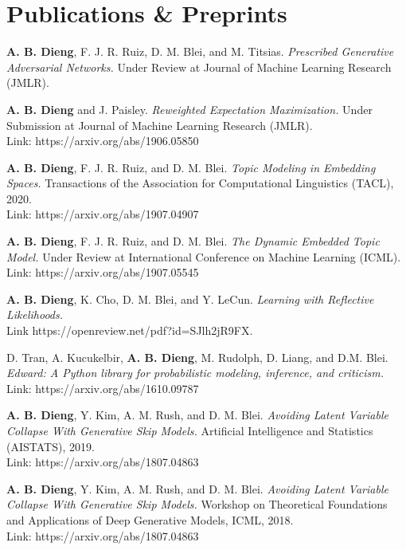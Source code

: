\documentclass[letterpaper,200pt]{article}
\renewenvironment{itemize}{
  \begin{list}{}{
    \setlength{\leftmargin}{1.5em}
  }
}{
  \end{list}
}
\begin{document}
\section*{Publications \& Preprints}
\begin{itemize}
	\item \textbf{A. B. Dieng}, F. J. R. Ruiz, D. M. Blei, and M. Titsias.
		\textit{Prescribed Generative Adversarial Networks.} 
		Under Review at Journal of Machine Learning Research (JMLR).
	\item \textbf{A. B. Dieng} and J. Paisley.
		\textit{Reweighted Expectation Maximization.} 
		Under Submission at Journal of Machine Learning Research (JMLR).\\
		Link: https://arxiv.org/abs/1906.05850
	\item \textbf{A. B. Dieng}, F. J. R. Ruiz, and D. M. Blei.
		\textit{Topic Modeling in Embedding Spaces.} 
		Transactions of the Association for Computational Linguistics (TACL), 2020.\\
		Link: https://arxiv.org/abs/1907.04907
	\item \textbf{A. B. Dieng}, F. J. R. Ruiz, and D. M. Blei.
		\textit{The Dynamic Embedded Topic Model.} 
		Under Review at International Conference on Machine Learning (ICML).\\
		Link: https://arxiv.org/abs/1907.05545
	\item \textbf{A. B. Dieng}, K. Cho, D. M. Blei, and Y. LeCun.
		\textit{Learning with Reflective Likelihoods.} \\
		Link https://openreview.net/pdf?id=SJlh2jR9FX.
	\item D. Tran,  A. Kucukelbir, \textbf{A. B. Dieng}, M. Rudolph, D. Liang, and D.M. Blei. 
		\textit{Edward: A Python library for probabilistic modeling, inference, and criticism.} \\
		Link: https://arxiv.org/abs/1610.09787
	\item \textbf{A. B. Dieng}, Y. Kim, A. M. Rush, and D. M. Blei.
		\textit{Avoiding Latent Variable Collapse With Generative Skip Models.} 
		Artificial Intelligence and Statistics (AISTATS), 2019.\\
		Link: https://arxiv.org/abs/1807.04863
	\item \textbf{A. B. Dieng}, Y. Kim, A. M. Rush, and D. M. Blei.
		\textit{Avoiding Latent Variable Collapse With Generative Skip Models.} 
		Workshop on Theoretical Foundations and Applications of Deep Generative Models, ICML, 2018.\\
		Link: https://arxiv.org/abs/1807.04863

\end{itemize}
\end{document}
